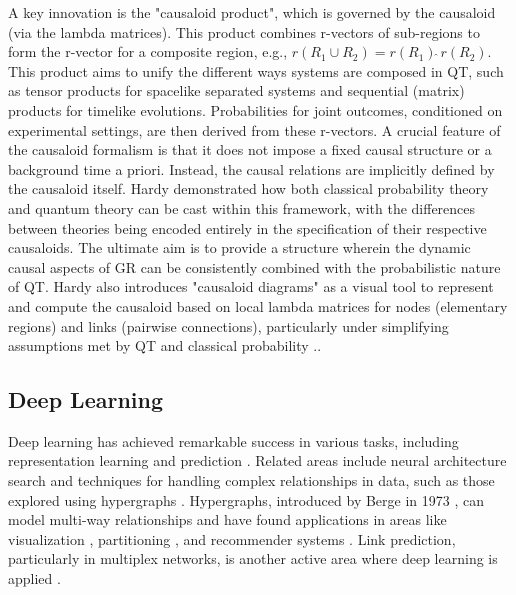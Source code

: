 A key innovation is the "causaloid product", which is governed by the causaloid (via the lambda matrices). This product combines r-vectors of sub-regions to form the r-vector for a composite region, e.g., $r(R_1 \cup R_2) = r(R_1) \hat{\;} r(R_2)$. This product aims to unify the different ways systems are composed in QT, such as tensor products for spacelike separated systems and sequential (matrix) products for timelike evolutions. Probabilities for joint outcomes, conditioned on experimental settings, are then derived from these r-vectors. A crucial feature of the causaloid formalism is that it does not impose a fixed causal structure or a background time a priori. Instead, the causal relations are implicitly defined by the causaloid itself. Hardy demonstrated how both classical probability theory and quantum theory can be cast within this framework, with the differences between theories being encoded entirely in the specification of their respective causaloids. The ultimate aim is to provide a structure wherein the dynamic causal aspects of GR can be consistently combined with the probabilistic nature of QT. Hardy also introduces "causaloid diagrams" as a visual tool to represent and compute the causaloid based on local lambda matrices for nodes (elementary regions) and links (pairwise connections), particularly under simplifying assumptions met by QT and classical probability \cite{hardy2005probability}.. 


\subsection{Deep Learning}

Deep learning has achieved remarkable success in various tasks, including representation learning and prediction \cite{Scholkopf2021Toward}. Related areas include neural architecture search \cite{Baker2017aDesigning, Bender2018Understanding} and techniques for handling complex relationships in data, such as those explored using hypergraphs \cite{Ouvrard2020Hypergraphs, Berge1973Graphs}. Hypergraphs, introduced by Berge in 1973 \cite{Berge1973Graphs}, can model multi-way relationships and have found applications in areas like visualization \cite{Alsallakh2016State, Jacomy2014ForceAtlas2}, partitioning \cite{Catalyurek1999Hypergraph, Devine2006Parallel, Yang2017Hypergraph}, and recommender systems \cite{Zheng2018Novel, Zhou2007Learning, Wu2018Nonnegative, Jin2015Low, Zhu2015ContentBased, Zhu2016Heterogeneous}. Link prediction, particularly in multiplex networks, is another active area where deep learning is applied \cite{Potluru2020Deeplex, Zhang2018Link}.

